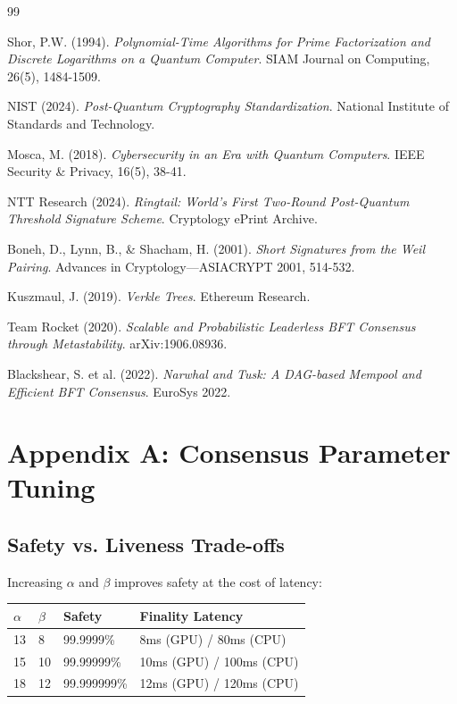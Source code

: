 \documentclass[11pt]{article}
\begin{document}
\begin{thebibliography}{99}

Shor, P.W. (1994).
\textit{Polynomial-Time Algorithms for Prime Factorization and Discrete Logarithms on a Quantum Computer}.
SIAM Journal on Computing, 26(5), 1484-1509.

NIST (2024).
\textit{Post-Quantum Cryptography Standardization}.
National Institute of Standards and Technology.

Mosca, M. (2018).
\textit{Cybersecurity in an Era with Quantum Computers}.
IEEE Security \& Privacy, 16(5), 38-41.

NTT Research (2024).
\textit{Ringtail: World's First Two-Round Post-Quantum Threshold Signature Scheme}.
Cryptology ePrint Archive.

Boneh, D., Lynn, B., \& Shacham, H. (2001).
\textit{Short Signatures from the Weil Pairing}.
Advances in Cryptology---ASIACRYPT 2001, 514-532.

Kuszmaul, J. (2019).
\textit{Verkle Trees}.
Ethereum Research.

Team Rocket (2020).
\textit{Scalable and Probabilistic Leaderless BFT Consensus through Metastability}.
arXiv:1906.08936.

Blackshear, S. et al. (2022).
\textit{Narwhal and Tusk: A DAG-based Mempool and Efficient BFT Consensus}.
EuroSys 2022.

\end{thebibliography}

\appendix

\section{Appendix A: Consensus Parameter Tuning}

\subsection{Safety vs. Liveness Trade-offs}

Increasing $\alpha$ and $\beta$ improves safety at the cost of latency:

\begin{table}[h]
\centering
\begin{tabular}{@{}llll@{}}
\toprule
$\alpha$ & $\beta$ & \textbf{Safety} & \textbf{Finality Latency} \\
\midrule
13 & 8 & 99.9999\% & 8ms (GPU) / 80ms (CPU) \\
15 & 10 & 99.99999\% & 10ms (GPU) / 100ms (CPU) \\
18 & 12 & 99.999999\% & 12ms (GPU) / 120ms (CPU) \\
\bottomrule
\end{tabular}

\end{table}
\end{document}

